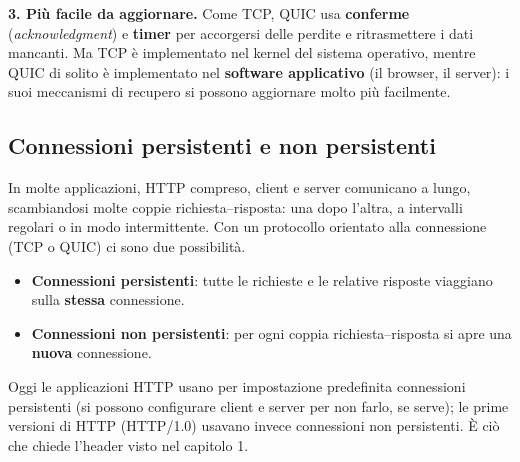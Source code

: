 \textbf{3. Più facile da aggiornare.} Come TCP, QUIC usa \textbf{conferme}
(\textit{acknowledgment}) e \textbf{timer} per accorgersi delle perdite e
ritrasmettere i dati mancanti. Ma TCP è implementato nel kernel del sistema
operativo, mentre QUIC di solito è implementato nel \textbf{software
applicativo} (il browser, il server): i suoi meccanismi di recupero si possono
aggiornare molto più facilmente.

\subsection{Connessioni persistenti e non persistenti}

In molte applicazioni, HTTP compreso, client e server comunicano a lungo,
scambiandosi molte coppie richiesta--risposta: una dopo l'altra, a intervalli
regolari o in modo intermittente. Con un protocollo orientato alla connessione
(TCP o QUIC) ci sono due possibilità.

\begin{itemize}
  \item \textbf{Connessioni persistenti}: tutte le richieste e le relative
        risposte viaggiano sulla \textbf{stessa} connessione.
  \item \textbf{Connessioni non persistenti}: per ogni coppia
        richiesta--risposta si apre una \textbf{nuova} connessione.
\end{itemize}

Oggi le applicazioni HTTP usano per impostazione predefinita connessioni
persistenti (si possono configurare client e server per non farlo, se serve);
le prime versioni di HTTP (HTTP/1.0) usavano invece connessioni non
persistenti. È ciò che chiede l'header  visto nel
capitolo 1.


